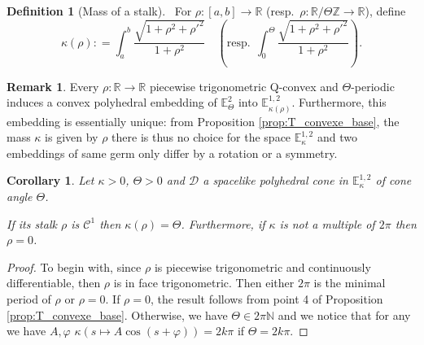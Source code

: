 \documentclass[a4paper,12pt]{article}
\def\ZZ{\mathbb{Z}}
\def\NN{\mathbb N}
\def\RR{\mathbb{R}}
\newcommand{\mass}[1]{{\mathbb E}^{1,2}_{#1}}
\def\Cone{\mathcal D}
\newtheorem{cor}[lem]{Corollary}
\theoremstyle{definition}
\newtheorem{defi}[lem]{Definition}	%
\newtheorem*{rem}{Remark}			 %
\begin{document}
					

					\begin{defi}[Mass of a stalk] \
					For $\rho: [a,b]\rightarrow \RR$ (resp.\ $\rho: \RR/\Theta \ZZ\rightarrow \RR$), define 	$$ \kappa(\rho): = \int_a^b \frac{\sqrt{1+\rho^2+\rho'^2}}{1+\rho^2}\quad \left(\mathrm{resp.} ~~\int_0^\Theta \frac{\sqrt{1+\rho^2+\rho'^2}}{1+\rho^2} \right).$$
					\end{defi}

					\begin{rem}
					 Every $\rho:\RR\rightarrow \RR$ piecewise trigonometric Q-convex and $\Theta$-periodic induces
					a convex polyhedral embedding of $\mathbb E^2_\Theta$ into $\mass{\kappa(\rho)}$.
					Furthermore, this embedding is essentially unique:
					from Proposition \ref{prop:T_convexe_base}, the mass $\kappa$ is given by $\rho$ there is thus no choice for the space $\mass{\kappa}$ and two embeddings of same germ only differ by a rotation or a symmetry.
					\end{rem}
 
					\begin{cor}\label{cor:kappa_coplanaire}
					Let $\kappa>0$, $\Theta>0$ and $\Cone$ a spacelike polyhedral cone in
					$\mass{\kappa}$ of cone angle $\Theta$.

					If its stalk $\rho$ is $\mathscr C^1$ then $\kappa(\rho)=\Theta$. 
					Furthermore, if $\kappa$ is not a multiple of $2\pi$ then $\rho=0$.
					\end{cor}

					\begin{proof} 
					To begin with, since $\rho$ is piecewise trigonometric and continuously differentiable, then $\rho$ is in face trigonometric. 
					Then either  $2\pi$ is the minimal period of $\rho$ or $\rho=0$.
					If $\rho=0$, the result follows from point 4 of Proposition \ref{prop:T_convexe_base}. Otherwise, we have $\Theta \in 2\pi \NN$ and we notice that for any we have $A,\varphi$  $\kappa(s\mapsto A\cos(s+\varphi))=2k\pi$ if $\Theta=2k \pi$.  
					\end{proof}
\end{document}
